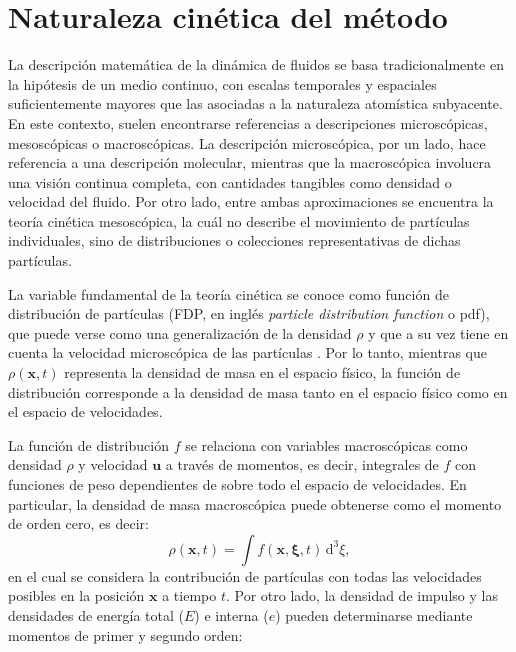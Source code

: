 \section{Naturaleza cin\'etica del m\'etodo}
\label{sec:kinetic}
La descripci\'on matem\'atica de la din\'amica de fluidos se basa tradicionalmente en la hip\'otesis de un medio continuo, con escalas temporales y espaciales suficientemente mayores que las asociadas a la naturaleza atom\'istica subyacente. En este contexto, suelen encontrarse referencias a descripciones microsc\'opicas, mesosc\'opicas o macrosc\'opicas. La descripci\'on microsc\'opica, por un lado, hace referencia a una descripci\'on molecular, mientras que la macrosc\'opica involucra una visi\'on continua completa, con cantidades tangibles como densidad o velocidad del fluido. Por otro lado, entre ambas aproximaciones se encuentra la teor\'ia cin\'etica mesosc\'opica, la cu\'al no describe el movimiento de part\'iculas individuales, sino de distribuciones o colecciones representativas de dichas part\'iculas.
\par
La variable fundamental de la teor\'ia cin\'etica se conoce como funci\'on de distribuci\'on de part\'iculas (FDP, en ingl\'es \emph{particle distribution function} o pdf), que puede verse como una generalizaci\'on de la densidad $\rho$ y que a su vez tiene en cuenta la velocidad microsc\'opica de las part\'iculas \bxi{}. Por lo tanto, mientras que $\rho(\bm{x},t)$ representa la densidad de masa en el espacio f\'isico, la funci\'on de distribuci\'on \fvar{} corresponde a la densidad de masa tanto en el espacio f\'isico como en el espacio de velocidades.
\par
La funci\'on de distribuci\'on $f$ se relaciona con variables macrosc\'opicas como densidad $\rho$ y velocidad $\bm{u}$ a trav\'es de momentos, es decir, integrales de $f$ con funciones de peso dependientes de \bxi{} sobre todo el espacio de velocidades. En particular, la densidad de masa macrosc\'opica puede obtenerse como el momento de orden cero, es decir:
\begin{equation}
	\rho(\bm{x},t) = \int f(\bm{x},\bm{\xi},t) \, \mbox{d}^3 \xi,
\end{equation}
en el cual se considera la contribuci\'on de part\'iculas con todas las velocidades posibles en la posici\'on $\bm{x}$ a tiempo $t$. Por otro lado, la densidad de impulso y las densidades de energ\'ia total ($E$) e interna ($e$) pueden determinarse mediante momentos de primer y segundo orden:
